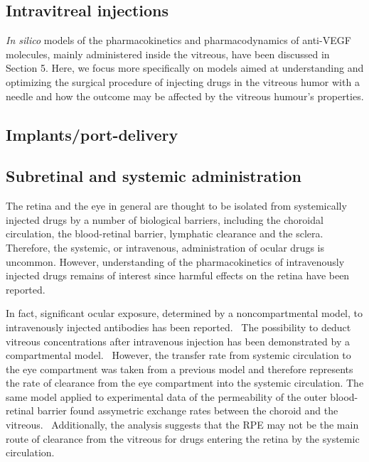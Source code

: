 \documentclass[12pt,a4paper]{journal}
\begin{document}
\subsection*{Intravitreal injections}

\textit{In silico} models of the pharmacokinetics and pharmacodynamics of anti-VEGF molecules, mainly administered inside the vitreous, have been discussed in Section 5.
Here, we focus more specifically on models aimed at understanding and optimizing the surgical procedure of injecting drugs in the vitreous humor with a needle and how the outcome may be affected by the vitreous humour's properties.





\subsection*{Implants/port-delivery}


\subsection*{Subretinal and systemic administration}

The retina and the eye in general are thought to be isolated from systemically injected drugs by a number of biological barriers, including the choroidal circulation, the blood-retinal barrier, lymphatic clearance and the sclera.
Therefore, the systemic, or intravenous, administration of ocular drugs is uncommon.
However, understanding of the pharmacokinetics of intravenously injected drugs remains of interest since harmful effects on the retina have been reported.~\cite{Fu_2017}

In fact, significant ocular exposure, determined by a noncompartmental model, to intravenously injected antibodies has been reported.~\cite{Shivva_2021}
The possibility to deduct vitreous concentrations after intravenous injection has been demonstrated by a compartmental model.~\cite{Vellonen_2015}
However, the transfer rate from systemic circulation to the eye compartment was taken from a previous model and therefore represents the rate of clearance from the eye compartment into the systemic circulation.
The same model applied to experimental data of the permeability of the outer blood-retinal barrier found assymetric exchange rates between the choroid and the vitreous.~\cite{Ramsay_2019}
Additionally, the analysis suggests that the RPE may not be the main route of clearance from the vitreous for drugs entering the retina by the systemic circulation.~\cite{Ramsay_2019}
\end{document}
